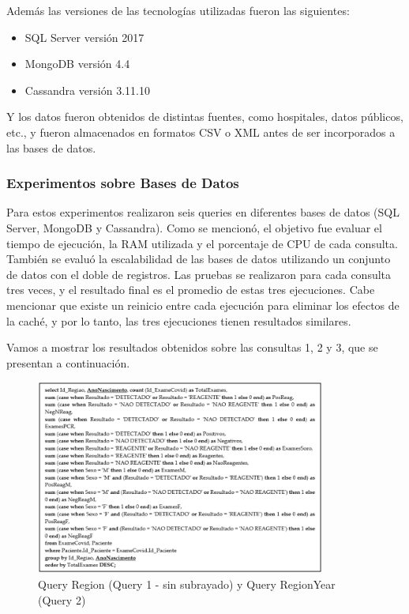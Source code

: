 \documentclass[pdflatex,sn-mathphys-num]{sn-jnl}
\theoremstyle{thmstyleone}%
\theoremstyle{thmstyletwo}%
\theoremstyle{thmstylethree}%
\begin{document}
Además las versiones de las tecnologías utilizadas fueron las siguientes:

\begin{itemize}
    \item SQL Server versión 2017
    \item MongoDB versión 4.4
    \item Cassandra versión 3.11.10
\end{itemize}

Y los datos fueron obtenidos de distintas fuentes, como hospitales, datos públicos, etc., y fueron almacenados en formatos CSV o XML antes de ser incorporados a las bases de datos.

\subsubsection{Experimentos sobre Bases de Datos}\label{sec511}

Para estos experimentos realizaron seis queries en diferentes bases de datos (SQL Server, MongoDB y Cassandra). Como se mencionó, el objetivo fue evaluar el tiempo de ejecución, la RAM utilizada y el porcentaje de CPU de cada consulta. También se evaluó la escalabilidad de las bases de datos utilizando un conjunto de datos con el doble de registros. Las pruebas se realizaron para cada consulta tres veces, y el resultado final es el promedio de estas tres ejecuciones. Cabe mencionar que existe un reinicio entre cada ejecución para eliminar los efectos de la caché, y por lo tanto, las tres ejecuciones tienen resultados similares.

Vamos a mostrar los resultados obtenidos sobre las consultas 1, 2 y 3, que se presentan a continuación.

\vspace{-0.3cm}

\begin{figure}[H]
    \begin{center}
        \includegraphics[width=0.85\textwidth]{figs/cov19-query12.png}
        \caption{Query Region (Query 1 - sin subrayado) y Query RegionYear (Query 2)}
        \label{cov19-q12}
    \end{center}
\end{figure}
\end{document}
